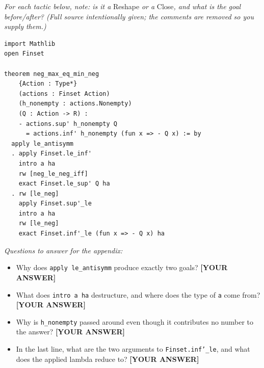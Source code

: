 \documentclass[11pt]{article}
\newcommand{\code}[1]{\texttt{#1}}
\newcommand{\blankone}{\textbf{[YOUR ANSWER]}}
\begin{document}
\emph{For each tactic below, note: is it a} Reshape \emph{or a}
Close\emph{, and what is the goal before/after? (Full source intentionally given;
the comments are removed so you supply them.)}

\begin{lstlisting}
import Mathlib
open Finset

theorem neg_max_eq_min_neg
    {Action : Type*}
    (actions : Finset Action)
    (h_nonempty : actions.Nonempty)
    (Q : Action -> R) :
    - actions.sup' h_nonempty Q
      = actions.inf' h_nonempty (fun x => - Q x) := by
  apply le_antisymm
  . apply Finset.le_inf'
    intro a ha
    rw [neg_le_neg_iff]
    exact Finset.le_sup' Q ha
  . rw [le_neg]
    apply Finset.sup'_le
    intro a ha
    rw [le_neg]
    exact Finset.inf'_le (fun x => - Q x) ha
\end{lstlisting}

\emph{Questions to answer for the appendix:}
\begin{itemize}
  \item Why does \code{apply le\_antisymm} produce exactly two goals?
    \blankone
  \item What does \code{intro a ha} destructure, and where does the type of
    \code{a} come from? \blankone
  \item Why is \code{h\_nonempty} passed around even though it contributes no
    number to the answer? \blankone
  \item In the last line, what are the two arguments to \code{Finset.inf'\_le},
    and what does the applied lambda reduce to? \blankone
\end{itemize}
\end{document}
